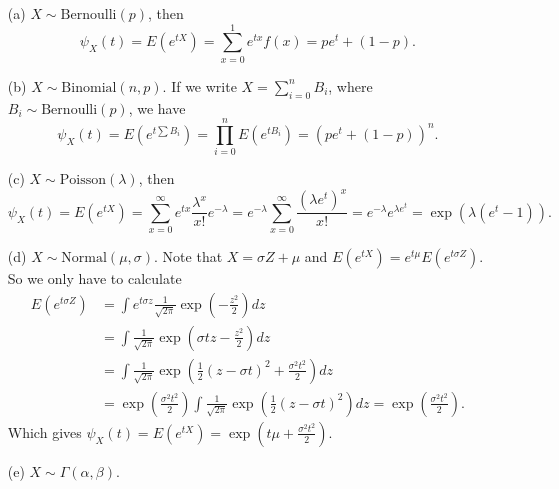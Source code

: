 \begin{itemize}
    \item[(a)] $X \sim \mathrm{Bernoulli}(p)$, then
        \begin{equation*}
            \psi_X(t) = E(e^{tX})
                = \sum_{x=0}^{1} e^{tx} f(x)
                = pe^t + (1 - p).
        \end{equation*}
    \item[(b)] $X \sim \mathrm{Binomial}(n, p)$.
        If we write $X = \sum_{i = 0}^n B_i$, where $B_i \sim \mathrm{Bernoulli}(p)$, we have
        \begin{equation*}
            \psi_X(t) = E(e^{t\sum B_i})
                = \prod_{i = 0}^n E(e^{tB_i})
                = (pe^t + (1 - p))^n.
        \end{equation*}
    \item[(c)] $X \sim \mathrm{Poisson}(\lambda)$, then
        \begin{equation*}
            \psi_X(t) = E(e^{tX})
                = \sum_{x = 0}^{\infty} e^{tx} \frac{\lambda^x}{x!} e^{-\lambda}
                = e^{-\lambda} \sum_{x = 0}^{\infty} \frac{(\lambda e^t)^x}{x!}
                = e^{-\lambda} e^{\lambda e^t}
                = \exp(\lambda(e^t - 1)).
        \end{equation*}
    \item[(d)] $X \sim \mathrm{Normal}(\mu, \sigma)$.
        Note that $X = \sigma Z + \mu$ and $E(e^{tX}) = e^{t\mu} E(e^{t\sigma Z})$.
        So we only have to calculate
        \begin{equation*}
            \begin{split}
                E(e^{t \sigma Z}) &= \int e^{t \sigma z} \frac{1}{\sqrt{2\pi}} \exp\left(-\frac{z^2}{2}\right) dz \\
                    &= \int \frac{1}{\sqrt{2 \pi}} \exp\left(\sigma t z - \frac{z^2}{2}\right) dz \\
                    &= \int \frac{1}{\sqrt{2 \pi}} \exp\left(\frac{1}{2} (z - \sigma t)^2 + \frac{\sigma^2 t^2}{2}\right) dz \\
                    &= \exp\left(\frac{\sigma^2 t^2}{2}\right) \int \frac{1}{\sqrt{2 \pi}} \exp\left(\frac{1}{2} (z - \sigma t)^2\right) dz
                    = \exp\left(\frac{\sigma^2 t^2}{2}\right).
            \end{split}
        \end{equation*}
        Which gives $\psi_X(t) = E(e^{tX}) = \exp\left(t \mu + \frac{\sigma^2 t^2}{2}\right)$.
    \item[(e)] $X \sim \Gamma(\alpha, \beta)$.

\end{itemize}
